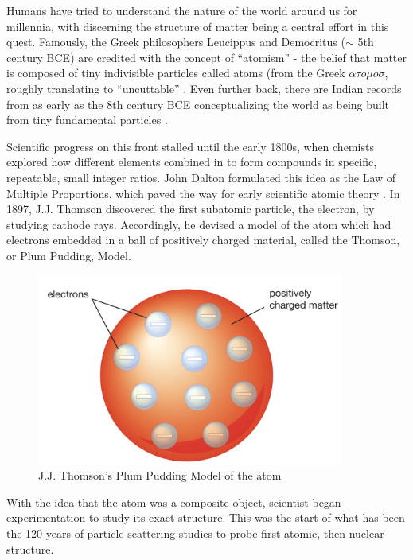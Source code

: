 
Humans have tried to understand the nature of the world around us for millennia, with discerning the structure of matter being a central effort in this quest. Famously, the Greek philosophers Leucippus and Democritus ($\sim$ 5th century BCE) are credited with the concept of ``atomism'' - the belief that matter is composed of tiny indivisible particles called atoms (from the Greek $\alpha \tau o \mu o \sigma$, roughly translating to ``uncuttable'' \cite{C.C.W.Taylor1999Commentary}. Even further back, there are Indian records from as early as the 8th century BCE conceptualizing the world as being built from tiny fundamental particles \cite{ThomasMcEvilley2002THePhilosophies}.

Scientific progress on this front stalled until the early 1800s, when chemists explored how different elements combined in to form compounds in specific, repeatable, small integer ratios. John Dalton formulated this idea as the Law of Multiple Proportions, which paved the way for early scientific atomic theory \cite{Britannica2010LawProportions}. In 1897, J.J. Thomson discovered the first subatomic particle, the electron, by studying cathode rays\cite{Thomson1901OnAtoms}. Accordingly, he devised a model of the atom which had electrons embedded in a ball of positively charged material, called the Thomson, or Plum Pudding, Model\cite{JaumeNavarro1995AThomson}.

\begin{figure}
    \centering
    \includegraphics[width=0.9\textwidth]{Chapters/Ch1-Intro/Ch1-Sec1-Background/pics/plumbpudding.png}
    \caption{J.J. Thomson's Plum Pudding Model of the atom \cite{Britannica2023ThomsonModel} }
    \label{fig:PlumPudding}
\end{figure}

With the idea that the atom was a composite object, scientist began experimentation to study its exact structure. This was the start of what has been the 120 years of particle scattering studies to probe first atomic, then nuclear structure. 

